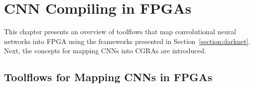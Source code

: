 \section{CNN Compiling in FPGAs}
\label{section:CNNVersat}

This chapter presents an overview of toolflows that map convolutional neural
networks into FPGA using the frameworks presented in
Section~\ref{section:darknet}. Next, the concepts for mapping CNNs
into CGRAs are introduced.

%

\subsection{Toolflows for Mapping CNNs in FPGAs}
\label{section:toolflow}

